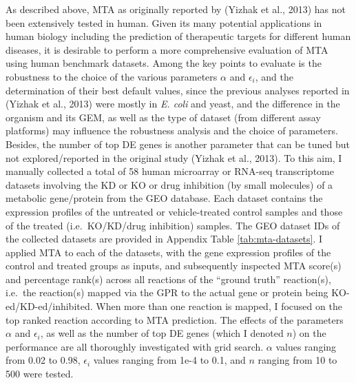 \documentclass[12pt,twoside,openany,\mydriver]{thesis}  %
\begin{document}
As described above, MTA as originally reported by (Yizhak et al., 2013) has not been extensively tested in human. Given its many potential applications in human biology including the prediction of therapeutic targets for different human diseases, it is desirable to perform a more comprehensive evaluation of MTA using human benchmark datasets. Among the key points to evaluate is the robustness to the choice of the various parameters \(\alpha\) and \(\epsilon_i\), and the determination of their best default values, since the previous analyses reported in (Yizhak et al., 2013) were mostly in \emph{E. coli} and yeast, and the difference in the organism and its GEM, as well as the type of dataset (from different assay platforms) may influence the robustness analysis and the choice of parameters. Besides, the number of top DE genes is another parameter that can be tuned but not explored/reported in the original study (Yizhak et al., 2013). To this aim, I manually collected a total of 58 human microarray or RNA-seq transcriptome datasets involving the KD or KO or drug inhibition (by small molecules) of a metabolic gene/protein from the GEO database. Each dataset contains the expression profiles of the untreated or vehicle-treated control samples and those of the treated (i.e.~KO/KD/drug inhibition) samples. The GEO dataset IDs of the collected datasets are provided in Appendix Table \ref{tab:mta-datasets}. I applied MTA to each of the datasets, with the gene expression profiles of the control and treated groups as inputs, and subsequently inspected MTA score(s) and percentage rank(s) across all reactions of the ``ground truth'' reaction(s), i.e.~the reaction(s) mapped via the GPR to the actual gene or protein being KO-ed/KD-ed/inhibited. When more than one reaction is mapped, I focused on the top ranked reaction according to MTA prediction. The effects of the parameters \(\alpha\) and \(\epsilon_i\), as well as the number of top DE genes (which I denoted \(n\)) on the performance are all thoroughly investigated with grid search. \(\alpha\) values ranging from 0.02 to 0.98, \(\epsilon_i\) values ranging from 1e-4 to 0.1, and \(n\) ranging from 10 to 500 were tested.
\end{document}
